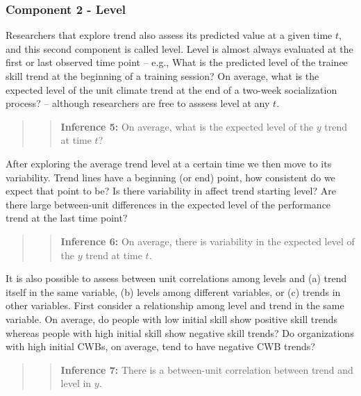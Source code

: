 \documentclass[english,,man]{apa6}
\theoremstyle{definition}
\theoremstyle{definition}
\theoremstyle{definition}
\theoremstyle{remark}
\begin{document}
\hypertarget{component-2---level}{%
\subsubsection{Component 2 - Level}\label{component-2---level}}

Researchers that explore trend also assess its predicted value at a
given time \(t\), and this second component is called level. Level is
almost always evaluated at the first or last observed time point --
e.g., What is the predicted level of the trainee skill trend at the
beginning of a training session? On average, what is the expected level
of the unit climate trend at the end of a two-week socialization
process? -- although researchers are free to asssess level at any \(t\).

\begin{quote}
\begin{quote}
\textbf{Inference 5:} On average, what is the expected level of the
\(y\) trend at time \(t\)?
\end{quote}
\end{quote}

After exploring the average trend level at a certain time we then move
to its variability. Trend lines have a beginning (or end) point, how
consistent do we expect that point to be? Is there variability in affect
trend starting level? Are there large between-unit differences in the
expected level of the performance trend at the last time point?

\begin{quote}
\begin{quote}
\textbf{Inference 6:} On average, there is variability in the expected
level of the \(y\) trend at time \(t\).
\end{quote}
\end{quote}

It is also possible to assess between unit correlations among levels and
(a) trend itself in the same variable, (b) levels among different
variables, or (c) trends in other variables. First consider a
relationship among level and trend in the same variable. On average, do
people with low initial skill show positive skill trends whereas people
with high initial skill show negative skill trends? Do organizations
with high initial CWBs, on average, tend to have negative CWB trends?

\begin{quote}
\begin{quote}
\textbf{Inference 7:} There is a between-unit correlation between trend
and level in \(y\).
\end{quote}
\end{quote}
\end{document}
